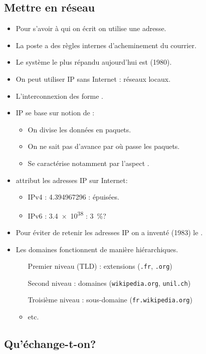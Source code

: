 \subsection{Mettre en réseau}
\begin{frame}
	\begin{itemize}
		\item Pour s'avoir à qui on écrit on utilise une adresse.
		\item La poste a des règles internes d'acheminement du courrier.
		\item Le système le plus répandu aujourd'hui est  (1980).
	\end{itemize}
\end{frame}

\begin{frame}
	\begin{itemize}
		\item On peut utiliser IP sans Internet : réseaux locaux.
		\item L'interconnexion des  forme .
		\item IP se base sur notion de :
			\begin{itemize}
				\item On divise les données en paquets.
				\item On ne sait pas d'avance par où passe les paquets.
				\item Se caractérise notamment par l'aspect .
			\end{itemize}
		\item {} attribut les adresses IP sur Internet:
			\begin{itemize}
				\item IPv4 : \num{4,3 94 967 296} : épuisées.
				\item IPv6 : \num{3,4e38} : \SI{3}{\percent}?
			\end{itemize}
	\end{itemize}

\end{frame}

\begin{frame}
	\begin{itemize}
		\item Pour éviter de retenir les adresses IP on a inventé (1983) le .
		\item Les domaines fonctionnent de manière hiérarchiques.
		\begin{itemize}
			\item[Premier niveau (TLD)] : extensions (\verb+.fr+, \verb+.org+)
			\item[Second niveau] : domaines (\verb+wikipedia.org+, \verb+unil.ch+)
			\item[Troisième niveau] : sous-domaine (\verb+fr.wikipedia.org+)
			\item etc.
		\end{itemize}
	\end{itemize}
\end{frame}

\subsection{Qu'échange-t-on?}%